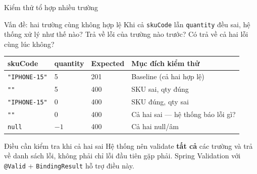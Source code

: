\documentclass[aspectratio=169,10pt]{beamer}
\begin{document}
\begin{frame}{Kiểm thử tổ hợp nhiều trường}
  \begin{block}{Vấn đề: hai trường cùng không hợp lệ}
    Khi cả \texttt{skuCode} lẫn \texttt{quantity} đều sai,
    hệ thống xử lý như thế nào?
    Trả về lỗi của trường nào trước?
    Có trả về cả hai lỗi cùng lúc không?
  \end{block}

  \vspace{0.3em}
  \begin{center}
  \small
  \begin{tabular}{p{2.5cm}p{2.5cm}p{2cm}p{4cm}}
    \toprule
    \textbf{skuCode} & \textbf{quantity} & \textbf{Expected} & \textbf{Mục đích kiểm thử} \\
    \midrule
    \texttt{"IPHONE-15"} & 5 & 201 & Baseline (cả hai hợp lệ) \\
    \texttt{""} & 5 & 400 & SKU sai, qty đúng \\
    \texttt{"IPHONE-15"} & 0 & 400 & SKU đúng, qty sai \\
    \texttt{""} & 0 & 400 & Cả hai sai --- hệ thống báo lỗi gì? \\
    \texttt{null} & $-1$ & 400 & Cả hai null/âm \\
    \bottomrule
  \end{tabular}
  \end{center}

  \begin{exampleblock}{Điều cần kiểm tra khi cả hai sai}
    Hệ thống nên validate \textbf{tất cả} các trường và trả về
    danh sách lỗi, không phải chỉ lỗi đầu tiên gặp phải.
    Spring Validation với \texttt{@Valid} + \texttt{BindingResult}
    hỗ trợ điều này.
  \end{exampleblock}
\end{frame}
\end{document}
